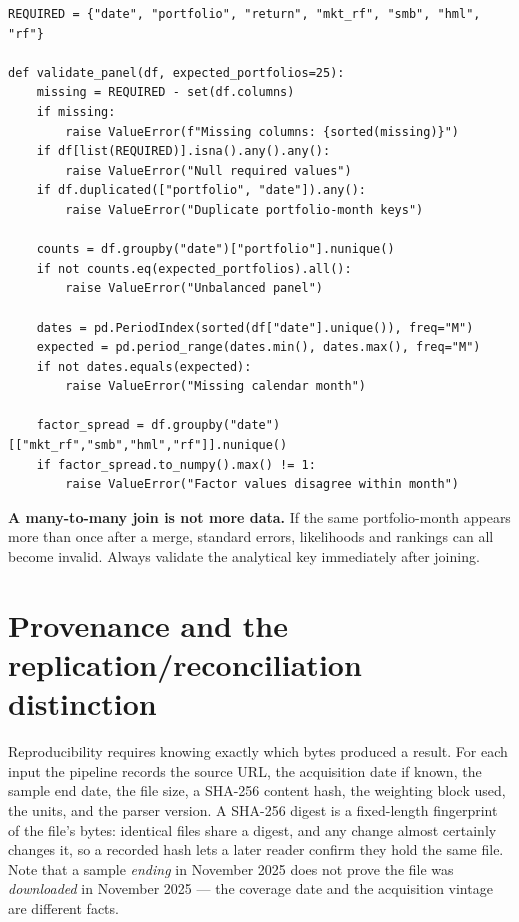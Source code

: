 \begin{verbatim}
REQUIRED = {"date", "portfolio", "return", "mkt_rf", "smb", "hml", "rf"}

def validate_panel(df, expected_portfolios=25):
    missing = REQUIRED - set(df.columns)
    if missing:
        raise ValueError(f"Missing columns: {sorted(missing)}")
    if df[list(REQUIRED)].isna().any().any():
        raise ValueError("Null required values")
    if df.duplicated(["portfolio", "date"]).any():
        raise ValueError("Duplicate portfolio-month keys")

    counts = df.groupby("date")["portfolio"].nunique()
    if not counts.eq(expected_portfolios).all():
        raise ValueError("Unbalanced panel")

    dates = pd.PeriodIndex(sorted(df["date"].unique()), freq="M")
    expected = pd.period_range(dates.min(), dates.max(), freq="M")
    if not dates.equals(expected):
        raise ValueError("Missing calendar month")

    factor_spread = df.groupby("date")[["mkt_rf","smb","hml","rf"]].nunique()
    if factor_spread.to_numpy().max() != 1:
        raise ValueError("Factor values disagree within month")
\end{verbatim}

\textbf{A many-to-many join is not more data.} If the same
portfolio-month appears more than once after a merge, standard errors,
likelihoods and rankings can all become invalid. Always validate the
analytical key immediately after joining.

\hypertarget{provenance}{%
\section{Provenance and the replication/reconciliation distinction}\label{provenance}}

Reproducibility requires knowing exactly which bytes produced a result.
For each input the pipeline records the source URL, the acquisition date
if known, the sample end date, the file size, a SHA-256 content hash, the
weighting block used, the units, and the parser version. A SHA-256 digest
is a fixed-length fingerprint of the file's bytes: identical files share a
digest, and any change almost certainly changes it, so a recorded hash
lets a later reader confirm they hold the same file. Note that a sample
\emph{ending} in November 2025 does not prove the file was
\emph{downloaded} in November 2025 --- the coverage date and the
acquisition vintage are different facts.

